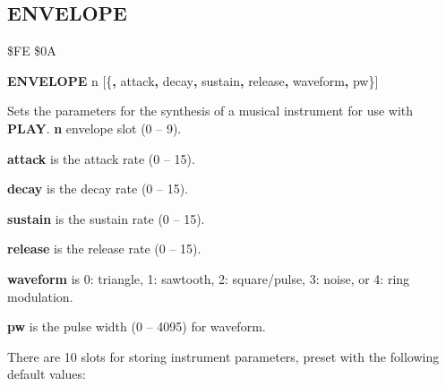 \newpage
\subsection{ENVELOPE}
\begin{description}[leftmargin=2cm,style=nextline]
\item [Token:]    \$FE \$0A

\item [Format:]   {\bf ENVELOPE} n [\{{\bf,} attack{\bf,} decay{\bf,} sustain{\bf,} release{\bf,} waveform{\bf,} pw\}]

\item [Usage:]    Sets the parameters for the synthesis of a musical instrument for use with {\bf PLAY}.
                  {\bf n} envelope slot (0 -- 9).

                  {\bf attack} is the attack rate (0 -- 15).

                  {\bf decay} is the decay rate (0 -- 15).

                  {\bf sustain} is the sustain rate (0 -- 15).

                  {\bf release} is the release rate (0 -- 15).

                  {\bf waveform} is 0: triangle, 1: sawtooth, 2: square/pulse, 3: noise, or 4: ring modulation.

                  {\bf pw} is the pulse width (0 -- 4095) for waveform.

                  \label{envelopetable}
                  There are 10 slots for storing instrument parameters, preset with the following default values:


\end{description}
